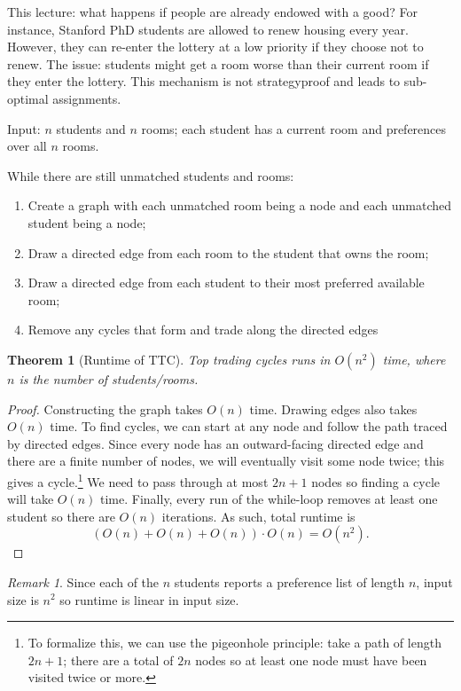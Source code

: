 \documentclass[dvipsnames]{article}
\newtheorem{theorem}{Theorem}[section]
\theoremstyle{definition}
\theoremstyle{remark}
\newtheorem*{remark}{Remark}
\newenvironment{mech}[1]{\begin{tcolorbox}[colback=red!5!white,colframe=red!75!black,title={#1}]}{\end{tcolorbox}}
\begin{document}
This lecture: what happens if people are already endowed with a good? For instance, Stanford PhD students are allowed to renew housing every year. However, they can re-enter the lottery at a low priority if they choose not to renew. The issue: students might get a room worse than their current room if they enter the lottery. This mechanism is not strategyproof and leads to sub-optimal assignments. 

Input: $n$ students and $n$ rooms; each student has a current room and preferences over all $n$ rooms.
\begin{mech}{Top Trading Cycles}
	While there are still unmatched students and rooms: 
	\begin{enumerate}
		\item Create a graph with each unmatched room being a node and each unmatched student being a node;
		\item Draw a directed edge from each room to the student that owns the room;
		\item Draw a directed edge from each student to their most preferred available room;
		\item Remove any cycles that form and trade along the directed edges
	\end{enumerate}
\end{mech}

\begin{theorem}[Runtime of TTC]
	Top trading cycles runs in $O(n^2)$ time, where $n$ is the number of students/rooms. 
\end{theorem}

\begin{proof}
	Constructing the graph takes $O(n)$ time. Drawing edges also takes $O(n)$ time. To find cycles, we can start at any node and follow the path traced by directed edges. Since every node has an outward-facing directed edge and there are a finite number of nodes, we will eventually visit some node twice; this gives a cycle.\footnote{To formalize this, we can use the pigeonhole principle: take a path of length $2n+1$; there are a total of $2n$ nodes so at least one node must have been visited twice or more.} We need to pass through at most $2n+1$ nodes so finding a cycle will take $O(n)$ time. Finally, every run of the while-loop removes at least one student so there are $O(n)$ iterations. As such, total runtime is
	$$(O(n)+O(n)+O(n)) \cdot O(n) = O(n^2).$$
\end{proof}

\begin{remark}
	Since each of the $n$ students reports a preference list of length $n$, input size is $n^2$ so runtime is linear in input size. 
\end{remark}
\end{document}

